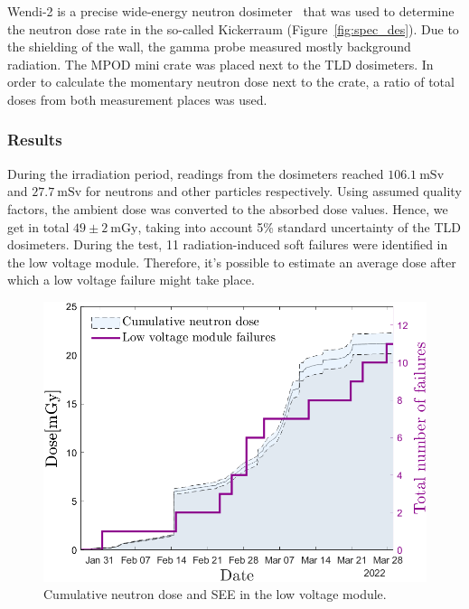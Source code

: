Wendi-2 is a precise wide-energy neutron dosimeter~\cite{wendi} that was used to determine the neutron dose rate in the so-called Kickerraum (Figure~\ref{fig:spec_des}). Due to the shielding of the wall, the gamma probe measured mostly background radiation. The MPOD mini crate was placed next to the TLD dosimeters. In order to calculate the momentary neutron dose next to the crate, a ratio of total doses from both measurement places was used. 
\newpage
\subsubsection{Results}
During the irradiation period, readings from the dosimeters reached $106.1\mathrm{\ mSv}$ and $27.7\mathrm{\ mSv}$ for neutrons and other particles respectively.
Using assumed quality factors, the ambient dose was converted to the absorbed dose values. Hence, we get in total $49\pm{2}\mathrm{\ mGy}$, taking into account 5\% standard uncertainty of the TLD dosimeters. During the test, 11 radiation-induced soft failures were identified in the low voltage module. Therefore, it's possible to estimate an average dose after which a low voltage failure might take place.
\begin{figure}[!h]
    \centering
    \includegraphics[width=0.6\columnwidth]{Chapter4/images/LV_failure_and_neutronsrate.png}
    \caption{Cumulative neutron dose and \gls{SEE} in the low voltage module.}
    \label{fig:lv_neutrons}
\end{figure}
